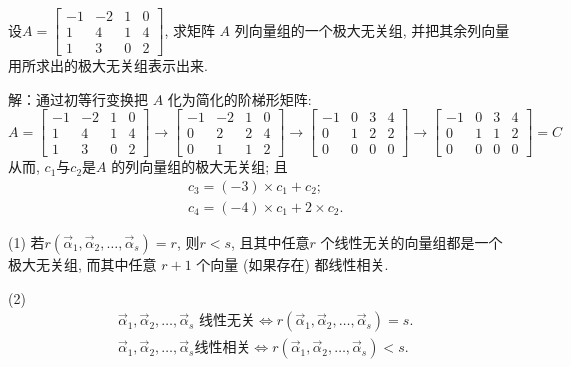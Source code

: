 \begin{eg}
设$A=\begin{bmatrix}-1&-2&1&0\\1&4&1&4\\1&3&0&2\end{bmatrix}$, 求矩阵 $A$ 列向量组的一个极大无关组, 并把其余列向量用所求出的极大无关组表示出来.
\end{eg}
解：通过初等行变换把 $A$ 化为简化的阶梯形矩阵:
\begin{displaymath}
A=\begin{bmatrix}-1&-2&1&0\\1&4&1&4\\1&3&0&2\end{bmatrix}\rightarrow
\begin{bmatrix}-1&-2&1&0\\ 0&2&2&4\\0&1&1&2\end{bmatrix}\rightarrow
\begin{bmatrix}-1&0&3&4\\0&1&2&2\\0&0&0&0\end{bmatrix}\rightarrow
\begin{bmatrix}-1&0&3&4\\0&1&1&2\\0&0&0&0\end{bmatrix}=C\end{displaymath}
从而, $c_1$与$c_2$是$A$ 的列向量组的极大无关组; 且
\begin{displaymath}\begin{aligned}
&c_3=(-3)\times c_1+c_2;\\
&c_4=(-4)\times c_1+2\times c_2.\end{aligned}\end{displaymath}

\begin{eg}
(1) 若$r(\vec{\alpha}_1,\vec{\alpha}_2,\dots, \vec{\alpha}_s)=r$, 则$r<s$, 且其中任意$r$ 个线性无关的向量组都是一个极大无关组, 而其中任意 $r +1$ 个向量 (如果存在) 都线性相关.

(2) \begin{displaymath}
\begin{aligned}&\vec{\alpha}_1,\vec{\alpha}_2,\dots, \vec{\alpha}_s \mbox{ 线性无关}\Leftrightarrow r(\vec{\alpha}_1,\vec{\alpha}_2,\dots, \vec{\alpha}_s)=s. \\
&\vec{\alpha}_1,\vec{\alpha}_2,\dots, \vec{\alpha}_s\mbox{线性相关}\Leftrightarrow r(\vec{\alpha}_1,\vec{\alpha}_2,\dots, \vec{\alpha}_s)<s.\end{aligned}\end{displaymath}
\end{eg}

